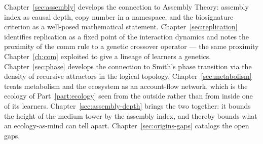 Chapter~\ref{sec:assembly} develops the connection to Assembly Theory:
assembly index as causal depth, copy number in a namespace, and the
biosignature criterion as a well-posed mathematical statement.
Chapter~\ref{sec:replication} identifies replication as a fixed point of
the interaction dynamics and notes the proximity of the comm rule to a
genetic crossover operator --- the same proximity
Chapter~\ref{ch:com} exploited to give a lineage of learners a genetics.
Chapter~\ref{sec:phase} develops the connection to Smith's phase
transition via the density of recursive attractors in the logical
topology.
Chapter~\ref{sec:metabolism} treats metabolism and the ecosystem as an
account-flow network, which is the ecology of Part~\ref{part:ecology}
seen from the outside rather than from inside one of its learners.
Chapter~\ref{sec:assembly-depth} brings the two together: it bounds the
height of the medium tower by the assembly index, and thereby bounds what
an ecology-as-mind can tell apart.
Chapter~\ref{sec:origins-gaps} catalogs the open gaps.

